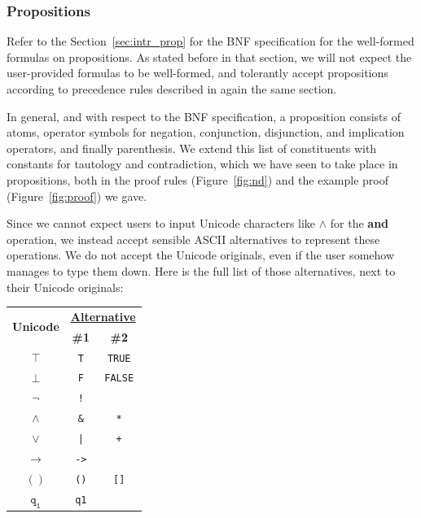 \documentclass{article}
\newcommand{\imp}{\ensuremath{\rightarrow}}
\begin{document}
\subsubsection{Propositions}

Refer to the Section~\ref{sec:intr_prop} for the BNF specification
for the well-formed formulas on propositions. As stated before
in that section, we will not expect the user-provided formulas
to be well-formed, and tolerantly accept propositions according
to precedence rules described in again the same section.

In general, and with respect to the BNF specification, a proposition
consists of atoms, operator symbols for negation, conjunction,
disjunction, and implication operators, and finally parenthesis.
We extend this list of constituents with constants for tautology and
contradiction, which we have seen to take place in propositions, both
in the proof rules (Figure~\ref{fig:nd}) and the example proof
(Figure~\ref{fig:proof}) we gave.

Since we cannot expect users to input Unicode characters like $\land$
for the \textbf{and} operation, we instead accept sensible ASCII
alternatives to represent these operations. We do not accept the
Unicode originals, even if the user somehow manages to type them down.
Here is the full list of those alternatives, next to their Unicode
originals:

\begin{center}
	\begin{tabular}{c | c c}
		\multirow{2}{*}{\textbf{Unicode}} & \multicolumn{2}{c}{\textbf{\underline{Alternative}}}\\
		& \textbf{\#1} & \textbf{\#2}\\
		\hline
		$\mathtt{\top}$  & \verb|T|                & \verb|TRUE|\\
		$\mathtt{\bot}$  & \verb|F|                & \verb|FALSE|\\
		$\mathtt{\neg}$  & \verb|!|                & \\
		$\mathtt{\land}$ & \verb|&|                & \verb|*|\\
		$\mathtt{\lor}$  & \verb^|^                & \verb|+|\\
		$\mathtt{\imp}$  & \verb|->|               & \\
		$\mathtt{()}$    & \verb|()|               & \verb|[]|\\
		$\mathtt{q_1}$   & \verb|q1|               &
	\end{tabular}
\end{center}
\end{document}
